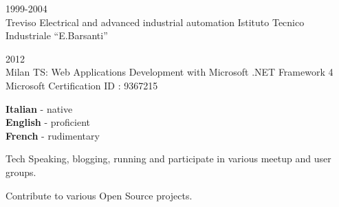 \documentclass[9pt]{developercv}
\begin{document}


\begin{entrylist}
	\entry
		{1999-2004\\\footnotesize{Treviso}}
		{Electrical and advanced industrial automation}
		{Istituto Tecnico Industriale “E.Barsanti”}
		{}
\end{entrylist}



\begin{entrylist}
	\entry
		{2012\\\footnotesize{Milan}}
		{TS: Web Applications Development with Microsoft .NET Framework 4}
		{Microsoft Certification}
		{ID : 9367215}
\end{entrylist}



\begin{minipage}[t]{0.3\textwidth}
	\vspace{-\baselineskip}


	\textbf{Italian} - native\\
	\textbf{English} - proficient\\
	\textbf{French} - rudimentary
\end{minipage}
\hfill
\begin{minipage}[t]{0.3\textwidth}
	\vspace{-\baselineskip}


	Tech Speaking, blogging, running and participate in various meetup and user groups.
\end{minipage}
\hfill
\begin{minipage}[t]{0.3\textwidth}
	\vspace{-\baselineskip}


	Contribute to various Open Source projects.
\end{minipage}

\end{document}
